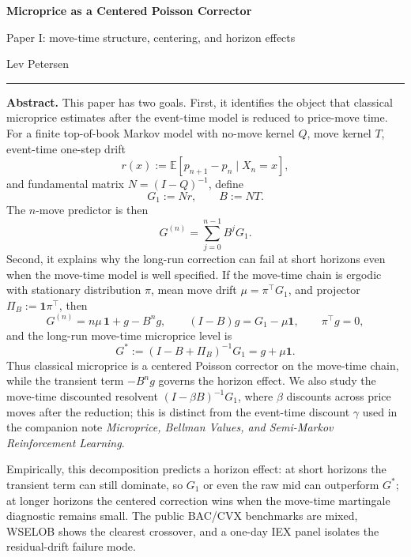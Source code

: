 \documentclass[11pt]{article}
\theoremstyle{plain}
\newcommand{\1}{\mathbf{1}}
\newcommand{\E}{\mathbb{E}}
\newcommand{\PiB}{\Pi_B}
\begin{document}
\thispagestyle{plain}

\begin{center}
{\LARGE\bfseries Microprice as a Centered Poisson Corrector\par}
\vspace{0.35em}
{\large\color{sectioncolor} Paper I: move-time structure, centering, and horizon effects\par}
\vspace{0.7em}
{\large Lev Petersen\par}
\vspace{0.7em}
{\color{titleline}\rule{0.34\textwidth}{0.8pt}}\par
\end{center}

\vspace{0.55em}
\begin{tcolorbox}[
  enhanced,
  colback=defnbg,
  colframe=sectioncolor!18,
  boxrule=0.5pt,
  arc=1.5pt,
  left=8pt,
  right=8pt,
  top=6pt,
  bottom=6pt
]
\textbf{Abstract.} This paper has two goals. First, it identifies the object that classical microprice estimates after the event-time model is reduced to price-move time. For a finite top-of-book Markov model with no-move kernel $Q$, move kernel $T$, event-time one-step drift
\[
r(x):=\E[p_{n+1}-p_n\mid X_n=x],
\]
and fundamental matrix $N=(I-Q)^{-1}$, define
\[
G_1:=Nr,
\qquad
B:=NT.
\]
The $n$-move predictor is then
\[
G^{(n)}=\sum_{j=0}^{n-1}B^jG_1.
\]
Second, it explains why the long-run correction can fail at short horizons even when the move-time model is well specified. If the move-time chain is ergodic with stationary distribution $\pi$, mean move drift $\mu=\pi^\top G_1$, and projector $\PiB:=\1\pi^\top$, then
\[
G^{(n)}=n\mu\,\1+g-B^n g,
\qquad
(I-B)g=G_1-\mu\1,
\qquad
\pi^\top g=0,
\]
and the long-run move-time microprice level is
\[
G^*:=(I-B+\PiB)^{-1}G_1=g+\mu\1.
\]
Thus classical microprice is a centered Poisson corrector on the move-time chain, while the transient term $-B^n g$ governs the horizon effect. We also study the move-time discounted resolvent $(I-\beta B)^{-1}G_1$, where $\beta$ discounts across price moves after the reduction; this is distinct from the event-time discount $\gamma$ used in the companion note \emph{Microprice, Bellman Values, and Semi-Markov Reinforcement Learning}.

Empirically, this decomposition predicts a horizon effect: at short horizons the transient term can still dominate, so $G_1$ or even the raw mid can outperform $G^*$; at longer horizons the centered correction wins when the move-time martingale diagnostic remains small. The public BAC/CVX benchmarks are mixed, WSELOB shows the clearest crossover, and a one-day IEX panel isolates the residual-drift failure mode.
\end{tcolorbox}
\end{document}
